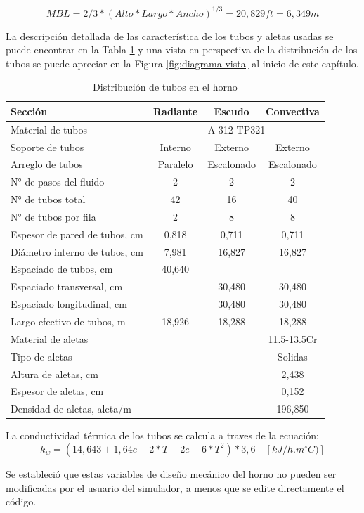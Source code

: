 \begin{equation} \label{eq:mbl}
    MBL = 2/3 * (Alto*Largo*Ancho)^{1/3} = 20,829ft = 6,349m
\end{equation}
\par La descripción detallada de las característica de los tubos y aletas usadas se puede encontrar en la Tabla \ref{tbl:tubes} y una vista en perspectiva de la distribución de los tubos se puede apreciar en la Figura \ref{fig:diagrama-vista} al inicio de este capítulo.
\begin{table}[hbt]
\begin{center}
\caption[Distribución de tubos en el horno]{Distribución de tubos en el horno}
\label{tbl:tubes}
\begin{tabular}{l|c|c|c}
Sección 					& Radiante	& Escudo		& Convectiva \\
\hline
Material de tubos			& \multicolumn{3}{c}{-- A-312 TP321 --} \\

Soporte de tubos    		& Interno	& Externo		& Externo		\\
Arreglo	de tubos    		& Paralelo	& Escalonado	& Escalonado	\\
N° de pasos del fluido		& 2	        & 2	            & 2	            \\
N° de tubos total    		& 42		& 16			& 40			\\
N° de tubos por fila		& 2			& 8				& 8				\\
Espesor de pared de tubos, cm	& 0,818		& 0,711			& 0,711			\\
Diámetro interno de tubos, cm	& 7,981		& 16,827		& 16,827		\\
Espaciado de tubos, cm  	& 40,640	& 				& 				\\
Espaciado transversal, cm  	&			& 30,480		& 30,480		\\
Espaciado longitudinal, cm 	&			& 30,480		& 30,480		\\
Largo efectivo de tubos, m	& 18,926    & 18,288		& 18,288		\\
\hline
Material de aletas			&			& 				& 11.5-13.5Cr	\\
Tipo de aletas				&			& 				& Solidas		\\	
Altura de aletas, cm		&			& 				& 2,438			\\
Espesor de aletas, cm		&			& 				& 0,152			\\
Densidad de aletas, aleta/m	&			& 				& 196,850		\\
\end{tabular} \end{center} \end{table}
\par La conductividad térmica de los tubos se calcula a traves de la ecuación:
\begin{equation}
k_w = (14,643 + 1,64e-2*T - 2e-6*T^2)*3,6 \quad [kJ/h.m^{\circ} C)]
\end{equation}
\par Se estableció que estas variables de diseño mecánico del horno no pueden ser modificadas por el usuario del simulador, a menos que se edite directamente el código.

